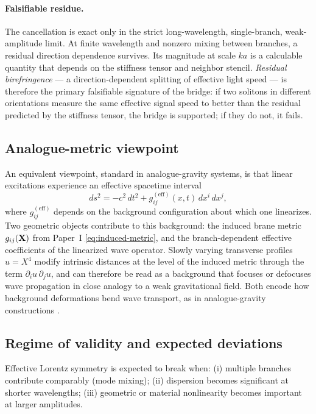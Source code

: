 \paragraph{Falsifiable residue.}
The cancellation is exact only in the strict long-wavelength, single-branch, weak-amplitude
limit.
At finite wavelength and nonzero mixing between branches, a residual direction dependence
survives.
Its magnitude at scale $ka$ is a calculable quantity that depends on the stiffness tensor and
neighbor stencil.
\emph{Residual birefringence} --- a direction-dependent splitting of effective light speed ---
is therefore the primary falsifiable signature of the bridge: if two solitons in different
orientations measure the same effective signal speed to better than the residual predicted by the
stiffness tensor, the bridge is supported; if they do not, it fails.

\subsection{Analogue-metric viewpoint}

An equivalent viewpoint, standard in analogue-gravity systems, is that linear excitations
experience an effective spacetime interval
\begin{equation}
  ds^2 = -c^2\,dt^2 + g^{(\text{eff})}_{ij}(x,t)\,dx^i\,dx^j,
  \label{eq:effective-metric-interval}
\end{equation}
where $g^{(\text{eff})}_{ij}$ depends on the background configuration about which one
linearizes.
Two geometric objects contribute to this background:
the induced brane metric $g_{ij}(\mathbf{X})$ from Paper~I \eqref{eq:induced-metric}, and
the branch-dependent effective coefficients of the linearized wave operator.
Slowly varying transverse profiles $u = X^4$ modify intrinsic distances at the level of the
induced metric through the term $\partial_i u\,\partial_j u$, and can therefore be read as a
background that focuses or defocuses wave propagation in close analogy to a weak gravitational
field.
Both encode how background deformations bend wave transport, as in analogue-gravity
constructions \citep{Barcelo2011AnalogueGravity,Volovik2003HeliumDroplet}.

\subsection{Regime of validity and expected deviations}
\label{subsec:lorentz-validity}

Effective Lorentz symmetry is expected to break when:
(i) multiple branches contribute comparably (mode mixing);
(ii) dispersion becomes significant at shorter wavelengths;
(iii) geometric or material nonlinearity becomes important at larger amplitudes.

